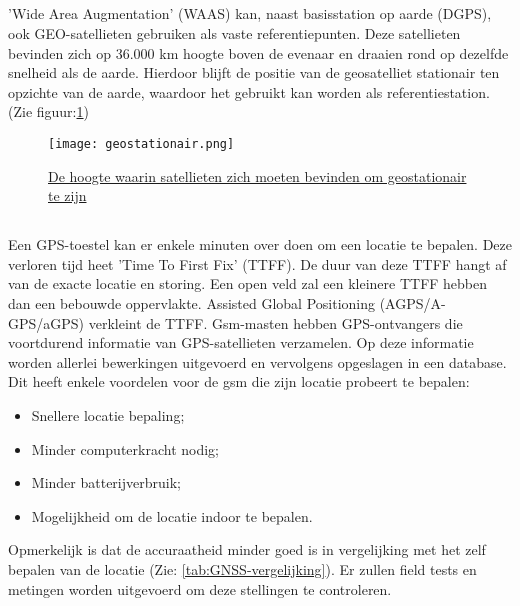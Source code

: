 \subsection{}
'Wide Area Augmentation' (WAAS) kan, naast basisstation op aarde (DGPS), ook GEO-satellieten gebruiken als vaste referentiepunten. Deze satellieten bevinden zich op 36.000 km hoogte boven de evenaar en draaien rond op dezelfde snelheid als de aarde. Hierdoor blijft de positie van de geosatelliet stationair ten opzichte van de aarde, waardoor het gebruikt kan worden als referentiestation.(Zie figuur:\ref{fig:geostationair})
\begin{figure}
	\texttt{[image: geostationair.png]}
	\caption[Geostationair]{\href{https://quizlet.com/393158527/de-kosmische-ruimte-de-ruimtevaart-en-haar-toepassingen-flash-cards/}{De hoogte waarin satellieten zich moeten bevinden om geostationair te zijn \autocite{fig_geostationair}}}
	\label{fig:geostationair} 
\end{figure}
\subsection{}
Een GPS-toestel kan er enkele minuten over doen om een locatie te bepalen. Deze verloren tijd heet 'Time To First Fix' (TTFF). De duur van deze TTFF hangt af van de exacte locatie en storing. Een open veld zal een kleinere TTFF hebben dan een bebouwde oppervlakte. Assisted Global Positioning (AGPS/A-GPS/aGPS) verkleint de TTFF. 
\newline
Gsm-masten hebben GPS-ontvangers die voortdurend informatie van GPS-satellieten verzamelen. Op deze informatie worden allerlei bewerkingen uitgevoerd en vervolgens opgeslagen in een database. Dit heeft enkele voordelen voor de gsm die zijn locatie probeert te bepalen:
\begin{itemize}
	\item Snellere locatie bepaling;
	\item Minder computerkracht nodig;
	\item Minder batterijverbruik;
	\item Mogelijkheid om de locatie indoor te bepalen.
\end{itemize} 
Opmerkelijk is dat de accuraatheid minder goed is in vergelijking met het zelf bepalen van de locatie (Zie: \ref{tab:GNSS-vergelijking}). Er zullen field tests en metingen worden uitgevoerd om deze stellingen te controleren. \autocite{agps}
